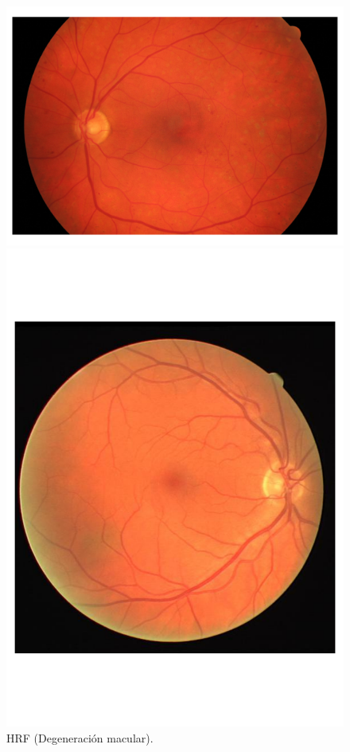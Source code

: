 \begin{figure}[h]
{}
	\includegraphics[width=\linewidth]{Figures/images}
	\caption[HRF]{HRF (Degeneración macular).}\label{fig:HRF}
\endminipage\hfill
	\includegraphics[width=\linewidth]{Figures/images1}

\end{figure}
